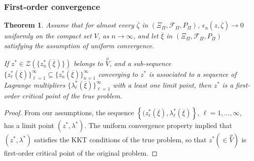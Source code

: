 \documentclass{beamer}
\newtheorem{theo}{Theorem}
\begin{document}
\begin{frame}
\frametitle{First-order convergence}

\begin{small}

\begin{theo}
\label{th:fod_first}
Assume that for almost every $\overline \zeta$ in $(\Xi_{\Pi}, \mathcal{F}_{\Pi}, P_{\Pi})$, $\epsilon_n(z, \overline{\zeta}) \rightarrow 0$ uniformly on the compact set $V$, as $n \rightarrow \infty$, and let $\overline \xi$ in $(\Xi_{\Pi}, \mathcal{F}_{\Pi}, P_{\Pi})$ satisfying the assumption of uniform convergence.

If $z^* \in \mathcal{Z}\left(\lbrace z^*_n(\overline{\xi})\rbrace\right)$ belongs to $\overset{o}{V}$, and a sub-sequence $\lbrace z^*_{\ell}(\overline{\xi}) \rbrace_{\ell = 1}^{\infty} \subseteq \lbrace z^*_n (\overline{\xi}) \rbrace_{n = 1}^{\infty}$ converging to $z^*$ is associated to a sequence of Lagrange multipliers $\lbrace \lambda^*_{\ell} (\overline{\xi}) \rbrace_{\ell = 1}^{\infty}$ with a least one limit point, then $z^*$ is a first-order critical point of the true problem.
\end{theo}

\begin{proof}
From our assumptions, the sequence $\left\lbrace (z^*_{\ell}(\overline{\xi}), \lambda^*_{\ell}(\overline{\xi}) \right\rbrace$, $\ell=1,\ldots,\infty$, has a limit point $( z^*, \lambda^* )$.
The uniform convergence property implied that $( z^*, \lambda^* )$ satisfies the KKT conditions of the true problem, so that $z^* (\in \overset{o}{V})$ is first-order critical point of the original problem.
\end{proof}

\end{small}

\end{frame}
\end{document}
